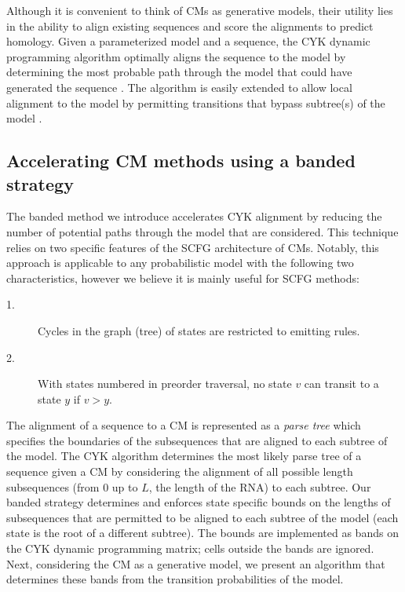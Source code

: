 \documentclass[11pt]{article}
\begin{document}
Although it is convenient to think of CMs as generative models, their
utility lies in the ability to align existing sequences and score
the alignments to predict homology. Given a parameterized model
and a sequence, the CYK dynamic programming algorithm optimally aligns
the sequence to the model by determining the most probable path
through the model that could have generated the
sequence \cite{Durbin98}. The algorithm
is easily extended to allow local alignment to the model by permitting
transitions that bypass subtree(s) of the model \cite{KleinEddy03}.

\subsection{Accelerating CM methods using a banded strategy}
The banded method we introduce accelerates CYK alignment by reducing
the number of potential paths through the model that are considered. This
technique relies on two specific features of the SCFG
architecture of CMs\@. Notably, this approach is applicable to any
probabilistic model with the following two characteristics, however we
believe it is mainly useful for SCFG methods:

\begin{description}
\item[1.] Cycles in the graph (tree) of states are restricted to emitting
  rules. 
\item[2.] With states numbered in preorder traversal, no state
  $v$ can transit to a state $y$ if $v > y$.
\end{description}

The alignment of a sequence to a CM is represented as a \emph{parse
tree} which specifies the boundaries of the subsequences that are
aligned to each subtree of the model. The CYK algorithm determines the
most likely parse tree of a sequence
given a CM by considering the alignment of all possible length
subsequences (from $0$ up to $L$, the length of the RNA)
to each subtree. Our banded strategy determines and
enforces state specific bounds on the lengths of subsequences that
are permitted to be aligned to each subtree of the model (each state
is the root of a different subtree). The bounds are implemented as
bands on the CYK dynamic programming matrix; cells outside the bands
are ignored. 
Next, considering the CM as a generative model, we present an
algorithm that determines these bands from the transition
probabilities of the model.
\end{document}
